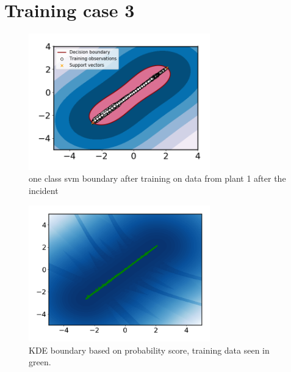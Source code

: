 

    
\chapter{Training case 3}
    \begin{figure}
        \centering
        \includegraphics[width=0.7\textwidth]{report/figures/analysis/plant2_train_long/svm_boundary.png}
        \caption{one class svm boundary after training on data from plant 1 after the incident}
        \label{fig:svm_train_p1_boundary}
    \end{figure}
    
    
     \begin{figure}
        \centering
        \includegraphics[width=0.7\textwidth]{report/figures/analysis/plant2_train_long/kde_boundary.png}
        \caption{KDE boundary based on probability score, training data seen in green.}
        \label{fig:my_label}
    \end{figure}
    
